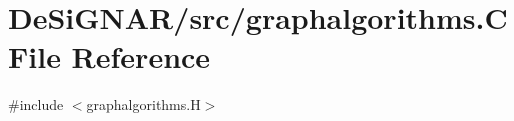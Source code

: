 \hypertarget{graphalgorithms_8_c}{}\section{De\+Si\+G\+N\+A\+R/src/graphalgorithms.C File Reference}
\label{graphalgorithms_8_c}
{\ttfamily \#include $<$graphalgorithms.\+H$>$}\newline
